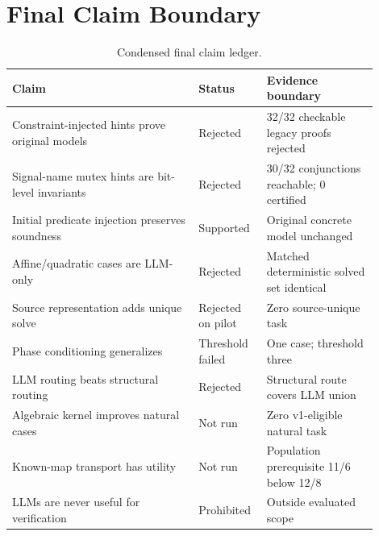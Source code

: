\documentclass[10pt]{article}
\begin{document}
\section{Final Claim Boundary}

\begin{table}[h]
\centering
\caption{Condensed final claim ledger.}
\small
\begin{tabular}{p{0.47\linewidth}p{0.15\linewidth}p{0.28\linewidth}}
\toprule
Claim & Status & Evidence boundary \\
\midrule
Constraint-injected hints prove original models & Rejected & 32/32 checkable legacy proofs rejected \\
Signal-name mutex hints are bit-level invariants & Rejected & 30/32 conjunctions reachable; 0 certified \\
Initial predicate injection preserves soundness & Supported & Original concrete model unchanged \\
Affine/quadratic cases are LLM-only & Rejected & Matched deterministic solved set identical \\
Source representation adds unique solve & Rejected on pilot & Zero source-unique task \\
Phase conditioning generalizes & Threshold failed & One case; threshold three \\
LLM routing beats structural routing & Rejected & Structural route covers LLM union \\
Algebraic kernel improves natural cases & Not run & Zero v1-eligible natural task \\
Known-map transport has utility & Not run & Population prerequisite 11/6 below 12/8 \\
LLMs are never useful for verification & Prohibited & Outside evaluated scope \\
\bottomrule
\end{tabular}
\end{table}



\end{document}
